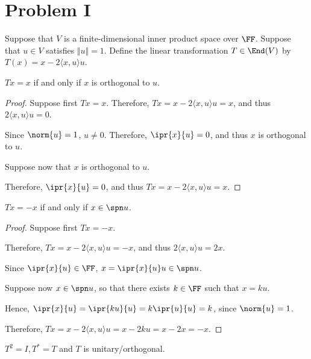 \documentclass[11pt]{scrartcl}
\begin{document}
\section{Problem I}
Suppose that $V$ is a finite-dimensional inner product space over
$\FF$. Suppose that $u \in V$ satisfies $\Vert u \Vert = 1$. Define the linear
transformation $T \in \End(V)$ by $T(x) = x-2\langle x,u\rangle u$.

\begin{lemma}
  \label{sec:problem-i}
  $Tx = x$ if and only if $x$ is orthogonal to $u$.
\end{lemma}

\begin{proof}
  \hfill

  Suppose first $Tx = x$. Therefore,
  $ Tx = x-2\langle x,u\rangle u = x$, and thus
  $2\langle x,u\rangle u = 0$.

  Since $\norm{u}=1$, $u\neq 0$. Therefore, $\ipr{x}{u} = 0$, and thus
  $x$ is orthogonal to $u$.

  Suppose now that $x$ is orthogonal to $u$.

  Therefore, $\ipr{x}{u}=0$, and thus
  $Tx = x- 2\langle x,u\rangle u = x$.
\end{proof}

\begin{lemma}
  \label{sec:problem-i-1}
  $Tx = -x$ if and only if $x\in \spn u$.
\end{lemma}
\begin{proof}
  \hfill

  Suppose first $Tx = -x$.

  Therefore, $ Tx = x-2\langle x,u\rangle u = -x$, and thus
  $2\langle x,u\rangle u = 2x$.

  Since $\ipr{x}{u}\in \FF$, $x = \ipr{x}{u}u \in \spn u$.

  Suppose now $x\in\spn u$, so that there exists $k\in\FF$ such that $x=ku$.

  Hence, $\ipr{x}{u} = \ipr{ku}{u} = k\ipr{u}{u} = k$, since
  $\norm{u}=1$.

  Therefore, $Tx = x-2\langle x,u\rangle u = x -2ku = x-2x= -x$.
\end{proof}

\begin{lemma}
$T^2=I, T^{*}=T$ and $T$ is unitary/orthogonal.
\end{lemma}
\end{document}
